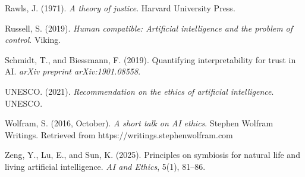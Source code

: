 \documentclass[12pt]{article}
\begin{document}
\begin{thebibliography}{99}
 Rawls, J. (1971). \textit{A theory of justice}. Harvard University Press.

 Russell, S. (2019). \textit{Human compatible: Artificial intelligence and the problem of control}. Viking.

 Schmidt, T., and Biessmann, F. (2019). Quantifying interpretability for trust in AI. \textit{arXiv preprint arXiv:1901.08558}.

 UNESCO. (2021). \textit{Recommendation on the ethics of artificial intelligence}. UNESCO.

 Wolfram, S. (2016, October). \textit{A short talk on AI ethics}. Stephen Wolfram Writings. Retrieved from https://writings.stephenwolfram.com

 Zeng, Y., Lu, E., and Sun, K. (2025). Principles on symbiosis for natural life and living artificial intelligence. \textit{AI and Ethics}, 5(1), 81–86.

\end{thebibliography}
\end{document}
